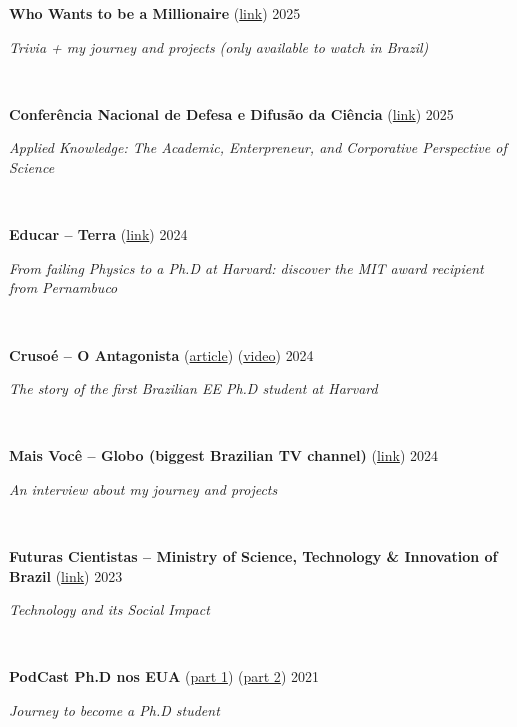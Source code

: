 \documentclass[letterpaper,10pt]{article}
\newcommand{\entry}[4]{

\begin{minipage}[t]{.15\textwidth}
\end{minipage}
\hfill\vline\hfill 
\begin{minipage}[t]{0.95\textwidth}
#2 \hfill \textsc{#1}

\textit{#3}

\footnotesize{#4}
\end{minipage}\\\vspace{.25cm}}
\begin{document}
\entry{2025}{\textbf{Who Wants to be a Millionaire} (\href{https://globoplay.globo.com/v/13718386/}{link})}{Trivia + my journey and projects (only available to watch in Brazil)}{}

\entry{2025}{\textbf{Conferência Nacional de Defesa e Difusão da Ciência} (\href{https://www.youtube.com/live/LHjNjV-f6q0?si=0vh8dLnf76PwcLZl&t=20177}{link})}{Applied Knowledge: The Academic, Enterpreneur, and Corporative Perspective of Science}{}

\entry{2024}{\textbf{Educar -- Terra} (\href{https://www.terra.com.br/noticias/educacao/da-recuperacao-em-fisica-ao-phd-em-harvard-conheca-a-historia-do-pernambucano-premiado-pelo-mit,3ed69c5460e41efbfe796dffdf6c47c4shi065se.html}{link})}{From failing Physics to a Ph.D at Harvard: discover the MIT award recipient from Pernambuco}{}

\entry{2024}{\textbf{Crusoé -- O Antagonista} (\href{https://crusoe.com.br/edicoes/325/a-historia-do-primeiro-brasileiro-phd-em-engenharia-em-harvard/}{article}) (\href{https://www.youtube.com/watch?v=wmis_W-EFKk}{video})}{The story of the first Brazilian EE Ph.D student at Harvard}{}

\entry{2024}{\textbf{Mais Você -- Globo (biggest Brazilian TV channel)} (\href{https://globoplay.globo.com/v/12673677/}{link})}{An interview about my journey and projects}{}

\entry{2023}{\textbf{Futuras Cientistas -- Ministry of Science, Technology \& Innovation of Brazil} (\href{https://www.youtube.com/watch?v=g5Inc6qXO6k&ab_channel=FuturasCientistas}{link})}{Technology and its Social Impact}{}

\entry{2021}{\textbf{PodCast Ph.D nos EUA} (\href{https://open.spotify.com/episode/37Rn34gdy7AxNgHeAvdIH0?si=11bf338624d04113}{part 1}) (\href{https://open.spotify.com/episode/7zYdb51lXeKbfpULOgpQlx?si=d1dbd10b9197486e}{part 2})}{Journey to become a Ph.D student}{}
\end{document}
